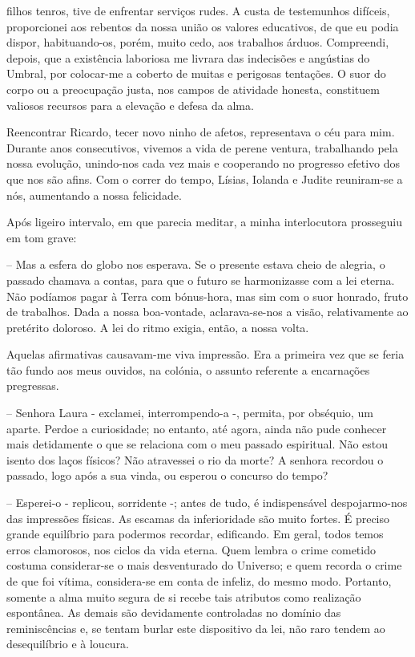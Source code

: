 \documentclass[portuguese,12pt,a4paper]{scrbook}
\begin{document}
	
	filhos tenros, tive de enfrentar serviços rudes. A custa de testemunhos difíceis, proporcionei aos rebentos da nossa união os valores educativos, de que eu podia dispor, habituando-os, porém, muito cedo, aos trabalhos árduos. Compreendi, depois, que a existência laboriosa me livrara das indecisões e angústias do Umbral, por colocar-me a coberto de muitas e perigosas tentações. O suor do corpo ou a preocupação justa, nos campos de atividade honesta, constituem valiosos recursos para a elevação e defesa da alma.
	
	Reencontrar Ricardo, tecer novo ninho de afetos, representava o céu para mim. Durante anos consecutivos, vivemos a vida de perene ventura, trabalhando pela nossa evolução, unindo-nos cada vez mais e cooperando no progresso efetivo dos que nos são afins. Com o correr do tempo, Lísias, Iolanda e Judite reuniram-se a nós, aumentando a nossa felicidade.
	
	Após ligeiro intervalo, em que parecia meditar, a minha interlocutora prosseguiu em tom grave:
	
	– Mas a esfera do globo nos esperava. Se o presente estava cheio de alegria, o passado chamava a contas, para que o futuro se harmonizasse com a lei eterna. Não podíamos pagar à Terra com bónus-hora, mas sim com o suor honrado, fruto de trabalhos. Dada a nossa boa-vontade, aclarava-se-nos a visão, relativamente ao pretérito doloroso. A lei do ritmo exigia, então, a nossa volta.
	
	Aquelas afirmativas causavam-me viva impressão. Era a primeira vez que se feria tão fundo aos meus ouvidos, na colónia, o assunto referente a encarnações pregressas.
	
	– Senhora Laura - exclamei, interrompendo-a -, permita, por obséquio, um aparte. Perdoe a curiosidade; no entanto, até agora, ainda não pude conhecer mais detidamente o que se relaciona com o meu passado espiritual. Não estou isento dos laços físicos? Não atravessei o rio da morte? A senhora recordou o passado, logo após a sua vinda, ou esperou o concurso do tempo?
	
	
	– Esperei-o - replicou, sorridente -; antes de tudo, é indispensável despojarmo-nos das impressões físicas. As escamas da inferioridade são muito fortes. É preciso grande equilíbrio para podermos recordar, edificando. Em geral, todos temos erros clamorosos, nos ciclos da vida eterna. Quem lembra o crime cometido costuma considerar-se o mais desventurado do Universo; e quem recorda o crime de que foi vítima, considera-se em conta de infeliz, do mesmo modo. Portanto, somente a alma muito segura de si recebe tais atributos como realização espontânea. As demais são devidamente controladas no domínio das reminiscências e, se tentam burlar este dispositivo da lei, não raro tendem ao desequilíbrio e à loucura.
	
\end{document}
